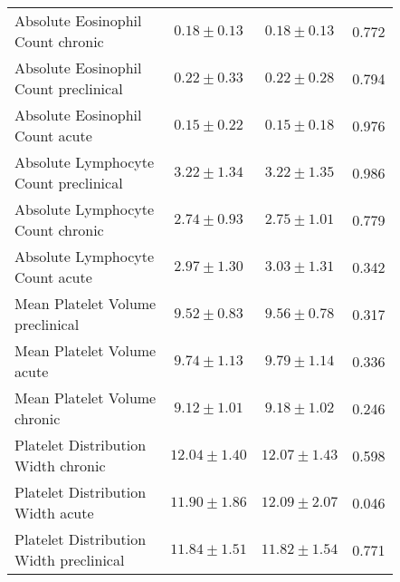 \begin{table}[htbp]
\begin{tabular}{lccc}
\makecell[l]{Absolute Eosinophil \\ Count chronic} & $0.18 \pm 0.13$ & $0.18 \pm 0.13$ & 0.772  \\

\makecell[l]{Absolute Eosinophil \\ Count preclinical} & $0.22 \pm 0.33$ & $0.22 \pm 0.28$ & 0.794  \\

\makecell[l]{Absolute Eosinophil \\ Count acute} & $0.15 \pm 0.22$ & $0.15 \pm 0.18$ & 0.976  \\

\makecell[l]{Absolute Lymphocyte \\ Count preclinical} & $3.22 \pm 1.34$ & $3.22 \pm 1.35$ & 0.986  \\

\makecell[l]{Absolute Lymphocyte \\ Count chronic} & $2.74 \pm 0.93$ & $2.75 \pm 1.01$ & 0.779  \\

\makecell[l]{Absolute Lymphocyte \\ Count acute} & $2.97 \pm 1.30$ & $3.03 \pm 1.31$ & 0.342  \\

\makecell[l]{Mean Platelet Volume \\ preclinical} & $9.52 \pm 0.83$ & $9.56 \pm 0.78$ & 0.317  \\

\makecell[l]{Mean Platelet Volume \\ acute} & $9.74 \pm 1.13$ & $9.79 \pm 1.14$ & 0.336  \\

\makecell[l]{Mean Platelet Volume \\ chronic} & $9.12 \pm 1.01$ & $9.18 \pm 1.02$ & 0.246  \\

\makecell[l]{Platelet Distribution \\ Width chronic} & $12.04 \pm 1.40$ & $12.07 \pm 1.43$ & 0.598  \\

\makecell[l]{Platelet Distribution \\ Width acute} & $11.90 \pm 1.86$ & $12.09 \pm 2.07$ & 0.046  \\

\makecell[l]{Platelet Distribution \\ Width preclinical} & $11.84 \pm 1.51$ & $11.82 \pm 1.54$ & 0.771  \\


\end{tabular}
\end{table}
